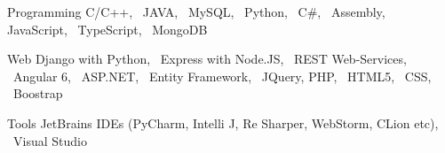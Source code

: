 


\begin{cvskills}

\vspace{2pt}
\cvskill
{Programming} %
{C/C++, ~JAVA, ~MySQL, ~Python, ~C\#, ~Assembly,~ JavaScript, ~TypeScript, ~MongoDB } %

\vspace{2pt}
\cvskill
{Web} %
{Django with Python, ~Express with Node.JS, ~REST Web-Services, ~Angular 6, ~ASP.NET, ~Entity Framework, ~JQuery, \newline PHP, ~HTML5, ~CSS, ~Boostrap} %

\vspace{-2pt}
\cvskill
{Tools} %
{JetBrains IDEs (PyCharm, Intelli J, Re Sharper, WebStorm, CLion etc), ~Visual Studio } %


\end{cvskills}